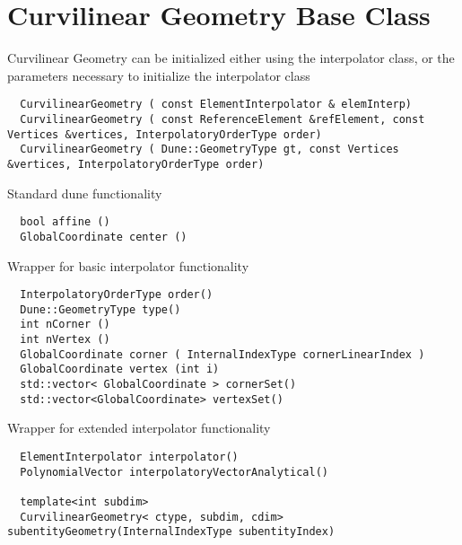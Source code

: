 \section{Curvilinear Geometry Base Class}
\label{interface-curvilineargeometry}

Curvilinear Geometry can be initialized either using the interpolator class, or the parameters necessary to initialize the interpolator class \\

\begin{mybox}
\begin{lstlisting}
  CurvilinearGeometry ( const ElementInterpolator & elemInterp)
  CurvilinearGeometry ( const ReferenceElement &refElement, const Vertices &vertices, InterpolatoryOrderType order)
  CurvilinearGeometry ( Dune::GeometryType gt, const Vertices &vertices, InterpolatoryOrderType order)
\end{lstlisting}
\end{mybox}


Standard dune functionality \\
\begin{mybox}
\begin{lstlisting}
  bool affine ()
  GlobalCoordinate center ()
\end{lstlisting}
\end{mybox}


Wrapper for basic interpolator functionality \\
\begin{mybox}
\begin{lstlisting}
  InterpolatoryOrderType order()
  Dune::GeometryType type()
  int nCorner ()
  int nVertex ()
  GlobalCoordinate corner ( InternalIndexType cornerLinearIndex )
  GlobalCoordinate vertex (int i)
  std::vector< GlobalCoordinate > cornerSet()
  std::vector<GlobalCoordinate> vertexSet()
\end{lstlisting}
\end{mybox}


Wrapper for extended interpolator functionality \\
\begin{mybox}
\begin{lstlisting}
  ElementInterpolator interpolator()
  PolynomialVector interpolatoryVectorAnalytical()

  template<int subdim>
  CurvilinearGeometry< ctype, subdim, cdim>  subentityGeometry(InternalIndexType subentityIndex)
\end{lstlisting}
\end{mybox}


